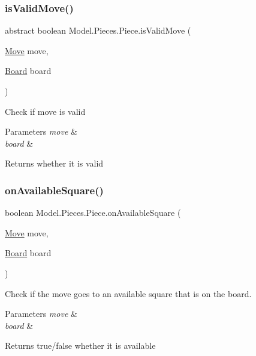 \subsubsection{\texorpdfstring{is\+Valid\+Move()}{isValidMove()}}
{\footnotesize\ttfamily abstract boolean Model.\+Pieces.\+Piece.\+is\+Valid\+Move (\begin{DoxyParamCaption}\item[{\hyperlink{class_model_1_1_move}{Move}}]{move,  }\item[{\hyperlink{class_model_1_1_board}{Board}}]{board }\end{DoxyParamCaption})\hspace{0.3cm}{\ttfamily [abstract]}}

Check if move is valid


\begin{DoxyParams}{Parameters}
{\em move} & \\
\hline
{\em board} & \\
\hline
\end{DoxyParams}
\begin{DoxyReturn}{Returns}
whether it is valid 
\end{DoxyReturn}
\hypertarget{class_model_1_1_pieces_1_1_piece_a727ec49c761935c667c5db1279485475}{}\label{class_model_1_1_pieces_1_1_piece_a727ec49c761935c667c5db1279485475} 
\subsubsection{\texorpdfstring{on\+Available\+Square()}{onAvailableSquare()}}
{\footnotesize\ttfamily boolean Model.\+Pieces.\+Piece.\+on\+Available\+Square (\begin{DoxyParamCaption}\item[{\hyperlink{class_model_1_1_move}{Move}}]{move,  }\item[{\hyperlink{class_model_1_1_board}{Board}}]{board }\end{DoxyParamCaption})}

Check if the move goes to an available square that is on the board. 
\begin{DoxyParams}{Parameters}
{\em move} & \\
\hline
{\em board} & \\
\hline
\end{DoxyParams}
\begin{DoxyReturn}{Returns}
true/false whether it is available 
\end{DoxyReturn}
\hypertarget{class_model_1_1_pieces_1_1_piece_ae4b44d64ae344e87088a8a36f8742df2}{}\label{class_model_1_1_pieces_1_1_piece_ae4b44d64ae344e87088a8a36f8742df2} 
